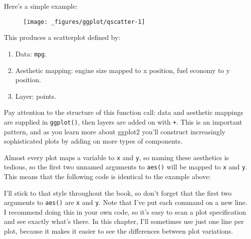 Here's a simple example:  

\begin{Shaded}
\begin{Highlighting}[]
\NormalTok{(}\OperatorTok{+}\StringTok{ }
\StringTok{  }\NormalTok{()}
\end{Highlighting}
\end{Shaded}

\begin{figure}[H]
  \centering
  \texttt{[image: \_figures/ggplot/qscatter-1]}
\end{figure}

This produces a scatterplot defined by:

\begin{enumerate}
\def\labelenumi{\arabic{enumi}.}
\tightlist
\item
  Data: \texttt{mpg}.
\item
  Aesthetic mapping: engine size mapped to x position, fuel economy to y
  position.
\item
  Layer: points.
\end{enumerate}

Pay attention to the structure of this function call: data and aesthetic
mappings are supplied in \texttt{ggplot()}, then layers are added on
with \texttt{+}. This is an important pattern, and as you learn more
about ggplot2 you'll construct increasingly sophisticated plots by
adding on more types of components.

Almost every plot maps a variable to \texttt{x} and \texttt{y}, so
naming these aesthetics is tedious, so the first two unnamed arguments
to \texttt{aes()} will be mapped to \texttt{x} and \texttt{y}. This
means that the following code is identical to the example above:

\begin{Shaded}
\begin{Highlighting}[]
\OperatorTok{+}
\StringTok{  }\NormalTok{()}
\end{Highlighting}
\end{Shaded}

I'll stick to that style throughout the book, so don't forget that the
first two arguments to \texttt{aes()} are \texttt{x} and \texttt{y}.
Note that I've put each command on a new line. I recommend doing this in
your own code, so it's easy to scan a plot specification and see exactly
what's there. In this chapter, I'll sometimes use just one line per
plot, because it makes it easier to see the differences between plot
variations.

